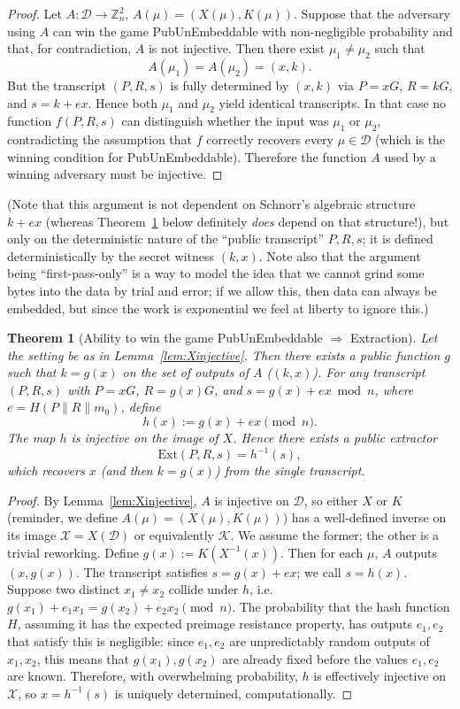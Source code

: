 \documentclass[10pt,a4paper]{article}
\newtheorem{theorem}{Theorem}
\theoremstyle{definition}   %
\theoremstyle{remark}       %
\begin{document}
\begin{proof}
Let $A:\mathcal{D}\to \mathbb{Z}_n^2$, $A(\mu)=(X(\mu),K(\mu))$.
Suppose that the adversary using $A$ can win the game PubUnEmbeddable with non-negligible probability and that, for contradiction, $A$ is not injective.
Then there exist $\mu_1\neq \mu_2$ such that
\[
A(\mu_1) = A(\mu_2) = (x,k).
\]
But the transcript $(P,R,s)$ is fully determined by $(x,k)$ via
$P=xG$, $R=kG$, and $s=k+ex$. Hence both $\mu_1$ and $\mu_2$ yield
identical transcripts. In that case no function $f(P,R,s)$ can
distinguish whether the input was $\mu_1$ or $\mu_2$, contradicting
the assumption that $f$ correctly recovers every $\mu\in\mathcal D$ (which is the winning condition for PubUnEmbeddable).
Therefore the function $A$ used by a winning adversary must be injective.
\end{proof}

(Note that this argument is not dependent on Schnorr's algebraic structure $k + ex$ (whereas Theorem~\ref{thm:extraction} below definitely \emph{does} depend on that structure!), but only on the deterministic nature of the ``public transcript'' $P, R, s$; it is defined deterministically by the secret witness $(k, x)$. Note also that the argument being ``first-pass-only'' is a way to model the idea that we cannot grind some bytes into the data by trial and error; if we allow this, then data can always be embedded, but since the work is exponential we feel at liberty to ignore this.)

\begin{theorem}[Ability to win the game PubUnEmbeddable $\Rightarrow$ Extraction]
\label{thm:extraction}
Let the setting be as in Lemma~\ref{lem:Xinjective}.
Then there exists a public function $g$ such that $k=g(x)$ on the set of outputs of $A$ ($(k, x)$).
For any transcript $(P,R,s)$ with $P=xG$, $R=g(x)G$, and $s=g(x)+ex\bmod n$,
where $e=H(P\|R\|m_0)$, define
\[
h(x) := g(x) + e x \pmod n.
\]
The map $h$ is injective on the image of $X$. Hence there exists a public extractor
\[
\mathrm{Ext}(P,R,s) = h^{-1}(s),
\]
which recovers $x$ (and then $k=g(x)$) from the single transcript.
\end{theorem}

\begin{proof}
By Lemma~\ref{lem:Xinjective}, $A$ is injective on $\mathcal{D}$,
so either $X$ or $K$ (reminder, we define $A(\mu) = (X(\mu), K(\mu))$) has a well-defined inverse on its image $\mathcal{X}=X(\mathcal{D})$ or equivalently $\mathcal{K}$. We assume the former; the other is a trivial reworking.
Define $g(x):=K(X^{-1}(x))$. Then for each $\mu$, $A$ outputs $(x,g(x))$.
The transcript satisfies $s=g(x)+ex$; we call $s = h(x)$.
Suppose two distinct $x_1\neq x_2$ collide under $h$, i.e.
$g(x_1)+e_1 x_1 = g(x_2)+e_2 x_2 \pmod n$.
The probability that the hash function $H$, assuming it has the expected preimage resistance property, has outputs $e_1, e_2$ that satisfy this is negligible: since $e_1, e_2$ are unpredictably random outputs of $x_1, x_2$, this means that $g(x_1), g(x_2)$ are already fixed before the values $e_1, e_2$ are known. Therefore, with overwhelming probability, $h$ is effectively injective on $\mathcal{X}$, so $x=h^{-1}(s)$ is uniquely determined, computationally.
\end{proof}
\end{document}

